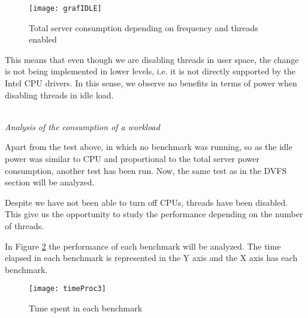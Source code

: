 \begin{figure}[H]
\begin{center}
\texttt{[image: grafIDLE]} %
\caption{Total server consumption depending on frequency and threads enabled}
\label{fig:cpuGraf} %
\end{center}
\end{figure}

This means that even though we are disabling threads in user space, the change is not being implemented in lower levels, i.e. it is not directly supported by the Intel CPU drivers. In this sense, we observe no benefits in terms of power when disabling threads in idle load.

\ \\ 

\emph{Analysis of the consumption of a workload}

Apart from the test above, in which no benchmark was running, so as the idle power was similar to CPU and proportional to the total server power consumption, another test has been run. Now, the same test as in the DVFS section will be analyzed.

Despite we have not been able to turn off CPUs, threads have been disabled. This give us the opportunity to study the performance depending on the number of threads.

In Figure \ref{fig:timeProc} the performance of each benchmark will be analyzed. The time elapsed in each benchmark is represented in the Y axis and the X axis has each benchmark. 

\begin{comment}The benchmark code must be analyzed in the same way:

Part1\_Part2
\begin{itemize}
\item [$-$] Part1: This is the name of the type of the benchmark. As it was detailed in a previous section, there are four benchmarks: Perlbench, Calculix, Mcf and Lbm.
\item [$-$] Part2: This is the frequency at which the processor runs for this benchmark.
\end{itemize}
\end{comment}

\begin{figure}[H]
\begin{center}
\texttt{[image: timeProc3]} %
\caption{Time spent in each benchmark}
\label{fig:timeProc} %
\end{center}
\end{figure}

